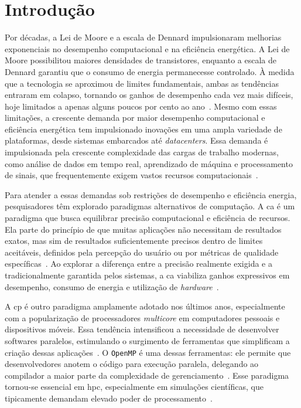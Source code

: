 \chapter{Introdução}\label{cap:introducao}

Por décadas, a Lei de Moore e a escala de Dennard impulsionaram melhorias exponenciais no desempenho computacional e na eficiência energética. A Lei de Moore possibilitou maiores densidades de transistores, enquanto a escala de Dennard garantiu que o consumo de energia permanecesse controlado. À medida que a tecnologia se aproximou de limites fundamentais, ambas as tendências entraram em colapso, tornando os ganhos de desempenho cada vez mais difíceis, hoje limitados a apenas alguns poucos por cento ao ano~\cite{hennessy2019}. Mesmo com essas limitações, a crescente demanda por maior desempenho computacional e eficiência energética tem impulsionado inovações em uma ampla variedade de plataformas, desde sistemas embarcados até \textit{datacenters}. Essa demanda é impulsionada pela crescente complexidade das cargas de trabalho modernas, como análise de dados em tempo real, aprendizado de máquina e processamento de sinais, que frequentemente exigem vastos recursos computacionais~\cite{mittal2016, dalloo2024}.

Para atender a essas demandas sob restrições de desempenho e eficiência energia, pesquisadores têm explorado paradigmas alternativos de computação. A \gls{ca} é um paradigma que busca equilibrar precisão computacional e eficiência de recursos. Ela parte do princípio de que muitas aplicações não necessitam de resultados exatos, mas sim de resultados suficientemente precisos dentro de limites aceitáveis, definidos pela percepção do usuário ou por métricas de qualidade específicas~\cite{dalloo2024}. Ao explorar a diferença entre a precisão realmente exigida e a tradicionalmente garantida pelos sistemas, a \gls{ca} viabiliza ganhos expressivos em desempenho, consumo de energia e utilização de \textit{hardware}~\cite{xu2016,leon2025a,leon2025b}.

A \gls{cp} é outro paradigma amplamente adotado nos últimos anos, especialmente com a popularização de processadores \textit{multicore} em computadores pessoais e dispositivos móveis. Essa tendência intensificou a necessidade de desenvolver softwares paralelos, estimulando o surgimento de ferramentas que simplificam a criação dessas aplicações~\cite{goncalves2016}. O \texttt{OpenMP} é uma dessas ferramentas: ele permite que desenvolvedores anotem o código para execução paralela, delegando ao compilador a maior parte da complexidade de gerenciamento~\cite{alrawais2021}. Esse paradigma tornou-se essencial em \gls{hpc}, especialmente em simulações científicas, que tipicamente demandam elevado poder de processamento~\cite{adhikari2012}.

